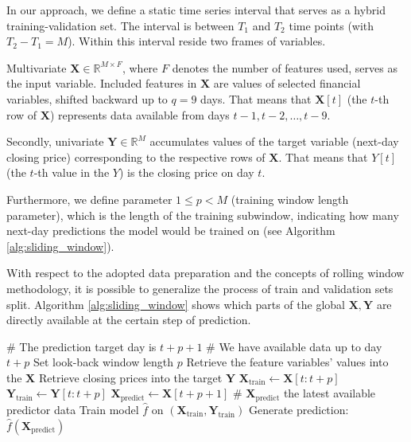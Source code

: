 \documentclass{svk_en}
\begin{document}
In our approach, we define a static time series interval that serves as a hybrid training-validation set. The interval is between $T_1$ and $T_2$ time points (with $T_2 - T_1 = M$).
Within this interval reside two frames of variables.

Multivariate $\mathbf{X} \in \mathbb{R}^{M \times F}$, where $F$ denotes the number of features used, serves as the input variable. Included features in $\mathbf{X}$ are values of
selected financial variables, shifted backward up to $q = 9$ days. That means that $\mathbf{X}[t]$ (the $t$-th row of $\mathbf{X}$) represents data 
available from days $t-1, t-2, \ldots, t-9$. 

Secondly, univariate $\mathbf{Y} \in \mathbb{R}^M$ accumulates values of the target variable (next-day closing price) corresponding to the respective rows of $\mathbf{X}$. That means that
$Y[t]$ (the $t$-th value in the $Y$) is the closing price on day $t$.

Furthermore, we define parameter $1 \leq p < M$ (training window length parameter), which is the length of the training subwindow, indicating how many next-day predictions the model 
would be trained on (see Algorithm \ref{alg:sliding_window}).  

With respect to the adopted data preparation and the concepts of rolling window methodology, it is possible to generalize the process of train and validation sets split. Algorithm \ref{alg:sliding_window}
shows which parts of the global $\mathbf{X}, \mathbf{Y}$ are directly available at the certain step of prediction.

\begin{algorithm}[H]
\caption{Rolling-window on $(T_1, T_2)$ interval}
\label{alg:sliding_window}
\begin{algorithmic}
\State \# The prediction target day is $t+p+1$
\State \# We have available data up to day $t+p$
\State Set look-back window length $p$ 
\State Retrieve the feature variables' values into the $\mathbf{X}$
    \State Retrieve closing prices into the target $\mathbf{Y}$
        \State $\mathbf{X}_{\text{train}} \gets \mathbf{X}[t : t+p]$ 
        \State $\mathbf{Y}_{\text{train}} \gets \mathbf{Y}[t : t+p]$
        \State $\mathbf{X}_{\text{predict}} \gets \mathbf{X}[t+p+1]$ 
        \State \# $\mathbf{X}_\text{predict}$ the latest available predictor data 
        \State Train model $\hat{f}$ on $(\mathbf{X}_{\text{train}}, \mathbf{Y}_{\text{train}})$
        \State Generate prediction: $\hat{f}(\mathbf{X}_{\text{predict}})$
    \EndFor
\EndFor
\end{algorithmic}
\end{algorithm}
\end{document}
